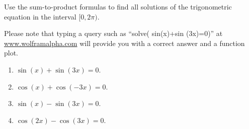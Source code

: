 Use the sum-to-product formulas to find all solutions of the trigonometric equation in the interval $[0,2\pi)$. 

Please note that typing a query such as ``solve( sin(x)+sin (3x)=0)'' at \url{www.wolframalpha.com} will provide you with a correct answer and a function plot.

\begin{enumerate}[ref={\fcProblemRef}]
\item $\sin(x)+\sin (3x)=0$.

\item $\cos(x)+\cos (-3x)=0$.

\item $\sin(x)-\sin (3x)=0$.

\item $\cos(2x)-\cos (3x)=0$.


\end{enumerate}
